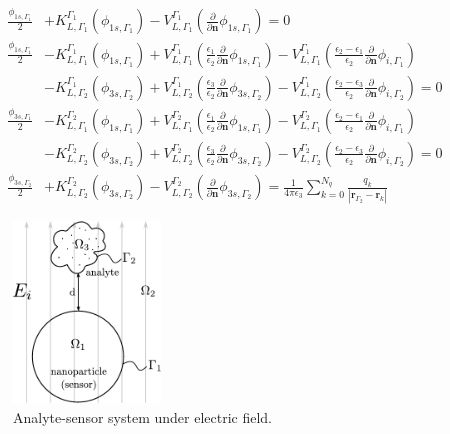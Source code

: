 \begin{align} \label{eq:integral_eq_lspr_system}
\frac{\phi_{1s,\Gamma_1}}{2}&+ K_{L,\Gamma_1}^{\Gamma_1}(\phi_{1s,\Gamma_1}) - V_{L,\Gamma_1}^{\Gamma_1} \left(\frac{\partial}{\partial \mathbf{n}}\phi_{1s,\Gamma_1} \right) = 0  \nonumber \\
 \frac{\phi_{1s,\Gamma_1}}{2}& - K_{L,\Gamma_1}^{\Gamma_1}(\phi_{1s,\Gamma_1}) + V_{L,\Gamma_1}^{\Gamma_1} \left(\frac{\epsilon_1}{\epsilon_2}\frac{\partial}{\partial \mathbf{n}}\phi_{1s,\Gamma_1} \right) - V_{L,\Gamma_1}^{\Gamma_1} \left(\frac{\epsilon_2-\epsilon_1}{\epsilon_2}\frac{\partial}{\partial \mathbf{n}}\phi_{i,\Gamma_1} \right) \nonumber\\ 
 & - K_{L,\Gamma_2}^{\Gamma_1}(\phi_{3s,\Gamma_2}) + V_{L,\Gamma_2}^{\Gamma_1} \left(\frac{\epsilon_3}{\epsilon_2}\frac{\partial}{\partial \mathbf{n}}\phi_{3s,\Gamma_2} \right)  - V_{L,\Gamma_2}^{\Gamma_1} \left(\frac{\epsilon_2 -\epsilon_3}{\epsilon_2}\frac{\partial}{\partial \mathbf{n}}\phi_{i,\Gamma_2} \right) = 0   \nonumber \\
 \frac{\phi_{3s,\Gamma_1}}{2}& - K_{L,\Gamma_1}^{\Gamma_2}(\phi_{1s,\Gamma_1}) + V_{L,\Gamma_1}^{\Gamma_2} \left(\frac{\epsilon_1}{\epsilon_2}\frac{\partial}{\partial \mathbf{n}}\phi_{1s,\Gamma_1} \right) - V_{L,\Gamma_1}^{\Gamma_2} \left(\frac{\epsilon_2-\epsilon_1}{\epsilon_2}\frac{\partial}{\partial \mathbf{n}}\phi_{i,\Gamma_1} \right) \nonumber \\
& - K_{L,\Gamma_2}^{\Gamma_2}(\phi_{3s,\Gamma_2}) + V_{L,\Gamma_2}^{\Gamma_2} \left(\frac{\epsilon_3}{\epsilon_2}\frac{\partial}{\partial \mathbf{n}}\phi_{3s,\Gamma_2} \right)  - V_{L,\Gamma_2}^{\Gamma_2} \left(\frac{\epsilon_2 -\epsilon_3}{\epsilon_2}\frac{\partial}{\partial \mathbf{n}}\phi_{i,\Gamma_2} \right) = 0  \nonumber \\
\frac{\phi_{3s,\Gamma_2}}{2}& + K_{L,\Gamma_2}^{\Gamma_2}(\phi_{3s,\Gamma_2}) - V_{L,\Gamma_2}^{\Gamma_2} \left( \frac{\partial}{\partial \mathbf{n}} \phi_{3s,\Gamma_2} \right) = \frac{1}{4\pi\epsilon_3} \sum_{k=0}^{N_q} \frac{q_k}{|\mathbf{r}_{\Gamma_2} - \mathbf{r}_k|} 
\end{align}

\begin{figure}%
    \centering
    \includegraphics[width=0.35\textwidth]{protein_sensor_regions.pdf} 
    \caption{Analyte-sensor system under electric field.}
    \label{fig:analyte-sensor}
 \end{figure}

